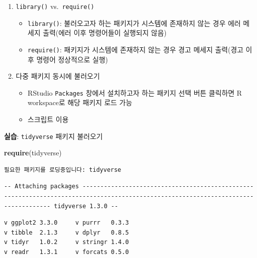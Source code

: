 \documentclass[
  11pt,
]{krantz}
\newenvironment{Shaded}{\begin{snugshade}}{\end{snugshade}}
\newcommand{\KeywordTok}[1]{\textcolor[rgb]{0.27,0.27,0.27}{\textbf{#1}}}
\newcommand{\NormalTok}[1]{#1}
\providecommand{\tightlist}{%
  \setlength{\itemsep}{0pt}\setlength{\parskip}{0pt}}
\let\BeginKnitrBlock\begin \let\EndKnitrBlock\end
\begin{document}
\begin{enumerate}
\def\labelenumi{\arabic{enumi}.}
\tightlist
\item
  \texttt{library()} vs.~\texttt{require()}

  \begin{itemize}
  \tightlist
  \item
    \texttt{library()}: 불러오고자 하는 패키지가 시스템에 존재하지 않는 경우 에러 메세지 출력(에러 이후 명령어들이 실행되지 않음)
  \item
    \texttt{require()}: 패키지가 시스템에 존재하지 않는 경우 경고 메세지 출력(경고 이후 명령어 정상적으로 실행)
  \end{itemize}
\item
  다중 패키지 동시에 불러오기

  \begin{itemize}
  \tightlist
  \item
    RStudio \texttt{Packages} 창에서 설치하고자 하는 패키지 선택 버튼 클릭하면 R workspace로 해당 패키지 로드 가능
  \item
    스크립트 이용
  \end{itemize}
\end{enumerate}

\footnotesize

\BeginKnitrBlock{rmdimportant}
\textbf{실습}: \texttt{tidyverse} 패키지 불러오기
\EndKnitrBlock{rmdimportant}

\normalsize

\footnotesize

\begin{Shaded}
\begin{Highlighting}[]
\KeywordTok{require}\NormalTok{(tidyverse)}
\end{Highlighting}
\end{Shaded}

\begin{verbatim}
필요한 패키지를 로딩중입니다: tidyverse
\end{verbatim}

\begin{verbatim}
-- Attaching packages ----------------------------------------------------------------------------------------------------------------------------------- tidyverse 1.3.0 --
\end{verbatim}

\begin{verbatim}
v ggplot2 3.3.0     v purrr   0.3.3
v tibble  2.1.3     v dplyr   0.8.5
v tidyr   1.0.2     v stringr 1.4.0
v readr   1.3.1     v forcats 0.5.0
\end{verbatim}
\end{document}
